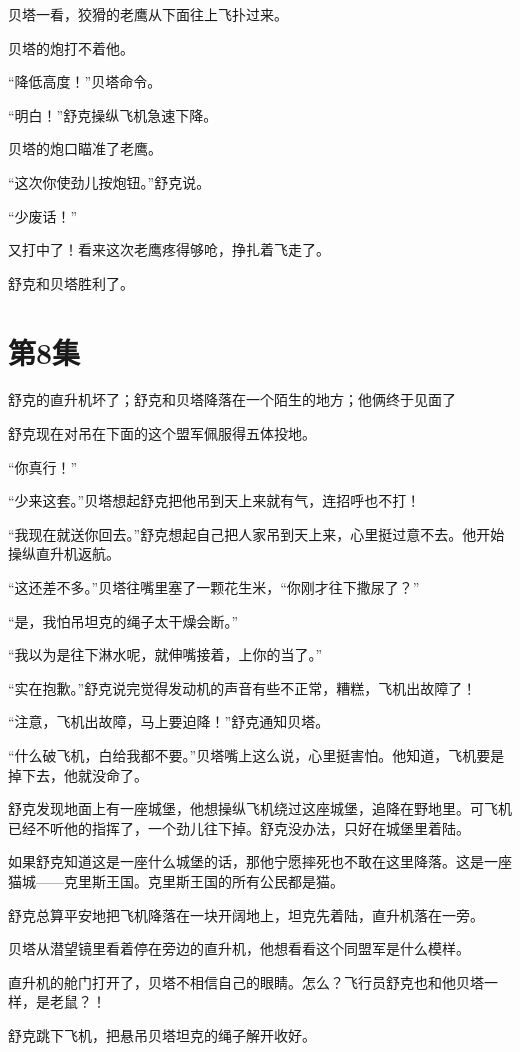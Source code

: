 \documentclass[a4paper,12pt,UTF8,twoside]{ctexbook}
\begin{document}
贝塔一看，狡猾的老鹰从下面往上飞扑过来。

贝塔的炮打不着他。

“降低高度！”贝塔命令。

“明白！”舒克操纵飞机急速下降。

贝塔的炮口瞄准了老鹰。

“这次你使劲儿按炮钮。”舒克说。

“少废话！”

又打中了！看来这次老鹰疼得够呛，挣扎着飞走了。

舒克和贝塔胜利了。

\chapter{第8集}

舒克的直升机坏了；舒克和贝塔降落在一个陌生的地方；他俩终于见面了

舒克现在对吊在下面的这个盟军佩服得五体投地。

“你真行！”

“少来这套。”贝塔想起舒克把他吊到天上来就有气，连招呼也不打！

“我现在就送你回去。”舒克想起自己把人家吊到天上来，心里挺过意不去。他开始操纵直升机返航。

“这还差不多。”贝塔往嘴里塞了一颗花生米，“你刚才往下撒尿了？”

“是，我怕吊坦克的绳子太干燥会断。”

“我以为是往下淋水呢，就伸嘴接着，上你的当了。”

“实在抱歉。”舒克说完觉得发动机的声音有些不正常，糟糕，飞机出故障了！

“注意，飞机出故障，马上要迫降！”舒克通知贝塔。

“什么破飞机，白给我都不要。”贝塔嘴上这么说，心里挺害怕。他知道，飞机要是掉下去，他就没命了。

舒克发现地面上有一座城堡，他想操纵飞机绕过这座城堡，追降在野地里。可飞机已经不听他的指挥了，一个劲儿往下掉。舒克没办法，只好在城堡里着陆。

如果舒克知道这是一座什么城堡的话，那他宁愿摔死也不敢在这里降落。这是一座猫城——克里斯王国。克里斯王国的所有公民都是猫。

舒克总算平安地把飞机降落在一块开阔地上，坦克先着陆，直升机落在一旁。

贝塔从潜望镜里看着停在旁边的直升机，他想看看这个同盟军是什么模样。

直升机的舱门打开了，贝塔不相信自己的眼睛。怎么？飞行员舒克也和他贝塔一样，是老鼠？！

舒克跳下飞机，把悬吊贝塔坦克的绳子解开收好。
\end{document}
